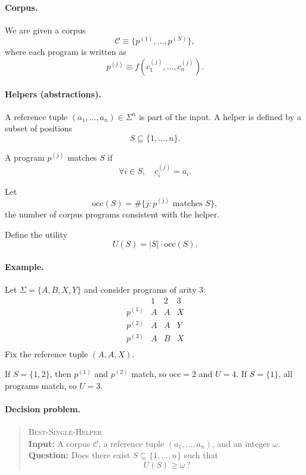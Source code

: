 \par\noindent
\paragraph{Corpus.}
We are given a corpus
\[
\mathcal C \equiv \{p^{(1)}, \dots, p^{(N)}\},
\]
where each program is written as
\[
p^{(j)} \equiv f(c_1^{(j)}, \dots, c_n^{(j)}).
\]

\par\noindent
\paragraph{Helpers (abstractions).}
A reference tuple $(a_1, \dots, a_n) \in \Sigma^n$ is part of the input.
A helper is defined by a subset of positions
\[
S \subseteq \{1, \dots, n\}.
\]

A program $p^{(j)}$ matches $S$ if
\[
\forall i \in S,\quad c_i^{(j)} = a_i.
\]

Let
\[
\mathrm{occ}(S) = \#\{ j : p^{(j)} \text{ matches } S \}, 
\]  the number of corpus programs consistent with the helper.

Define the utility
\[
U(S) = |S| \cdot \mathrm{occ}(S).
\]

\par\noindent
\paragraph{Example.}
Let $\Sigma = \{A, B, X, Y\}$ and consider programs of arity $3$:
\[
\begin{array}{c|ccc}
 & 1 & 2 & 3 \\
\hline
p^{(1)} & A & A & X \\
p^{(2)} & A & A & Y \\
p^{(3)} & A & B & X \\
\end{array}
\]
Fix the reference tuple $(A, A, X)$.

If $S = \{1,2\}$, then $p^{(1)}$ and $p^{(2)}$ match, so
$\mathrm{occ}=2$ and $U=4$.
If $S = \{1\}$, all programs match, so $U=3$.

\par\noindent
\paragraph{Decision problem.}
\begin{quote}
\textsc{Best-Single-Helper} \\
\textbf{Input:} A corpus $\mathcal C$, a reference tuple $(a_1,\dots,a_n)$, and an integer $\omega$. \\
\textbf{Question:} Does there exist $S \subseteq \{1,\dots,n\}$ such that
\[
U(S) \ge \omega \, ?
\]
\end{quote}

